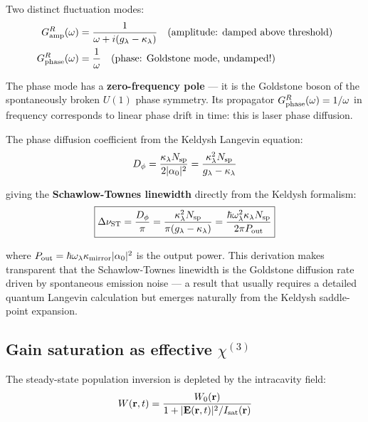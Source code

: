 \documentclass[12pt]{article}
\begin{document}
Two distinct fluctuation modes:
\begin{align}
  G^R_{\rm amp}(\omega) &= \frac{1}{\omega + i(g_\lambda-\kappa_\lambda)}
  \quad\text{(amplitude: damped above threshold)}
  \label{eq:GR_amp}\\
  G^R_{\rm phase}(\omega) &= \frac{1}{\omega}
  \quad\text{(phase: Goldstone mode, undamped!)}
  \label{eq:GR_phase}
\end{align}

The phase mode has a \textbf{zero-frequency pole} --- it is the Goldstone
boson of the spontaneously broken $U(1)$ phase symmetry.  Its propagator
$G^R_{\rm phase}(\omega) = 1/\omega$ in frequency corresponds to linear
phase drift in time: this is laser phase diffusion.

The phase diffusion coefficient from the Keldysh Langevin equation:
\begin{equation}
  D_\phi = \frac{\kappa_\lambda N_{\rm sp}}{2|\alpha_0|^2}
  = \frac{\kappa_\lambda^2 N_{\rm sp}}{g_\lambda - \kappa_\lambda}
  \label{eq:phase_diffusion}
\end{equation}

giving the \textbf{Schawlow-Townes linewidth}
\cite{Schawlow1958,Lax1967,Henry1982} directly from the Keldysh formalism:
\begin{equation}
  \boxed{
  \Delta\nu_{\rm ST} = \frac{D_\phi}{\pi}
  = \frac{\kappa_\lambda^2 N_{\rm sp}}{\pi(g_\lambda - \kappa_\lambda)}
  = \frac{\hbar\omega_\lambda^2\kappa_\lambda N_{\rm sp}}{2\pi P_{\rm out}}
  }
  \label{eq:schawlow_townes}
\end{equation}

where $P_{\rm out} = \hbar\omega_\lambda\kappa_{\rm mirror}|\alpha_0|^2$ is
the output power.  This derivation makes transparent that the Schawlow-Townes
linewidth is the Goldstone diffusion rate driven by spontaneous emission noise
--- a result that usually requires a detailed quantum Langevin calculation but
emerges naturally from the Keldysh saddle-point expansion.

\subsection{Gain saturation as effective $\chi^{(3)}$}
\label{sec:gain_sat}

The steady-state population inversion is depleted by the intracavity field:
\begin{equation}
  W(\mathbf{r},t) = \frac{W_0(\mathbf{r})}{1+|\mathbf{E}(\mathbf{r},t)|^2/I_{\rm sat}(\mathbf{r})}
  \label{eq:saturation}
\end{equation}
\end{document}

